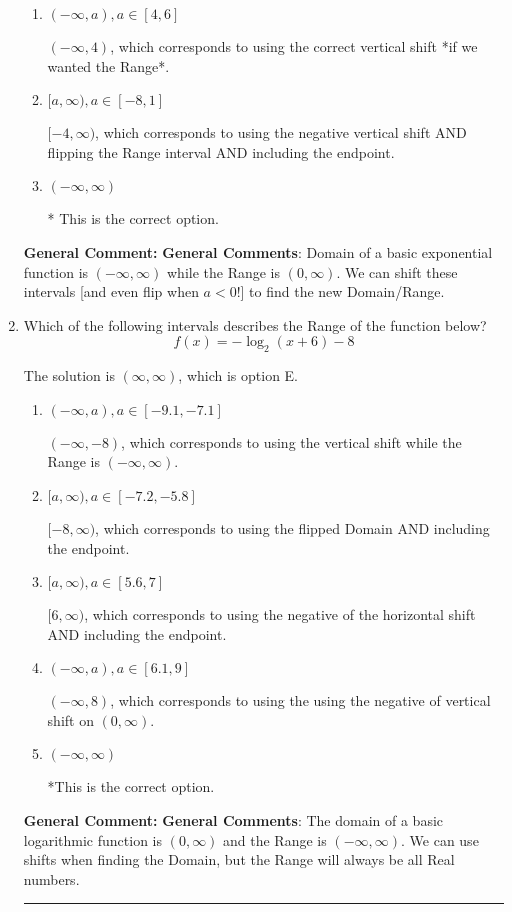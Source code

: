 \documentclass{extbook}[14pt]
\newcommand{\litem}[1]{\item #1

\rule{\textwidth}{0.4pt}}
\begin{document}
\begin{enumerate}
{\begin{enumerate}[label=\Alph*.]
$(-4, \infty)$, which corresponds to using the negative vertical shift AND flipping the Range interval.
\item \( (-\infty, a), a \in [4, 6] \)

$(-\infty, 4)$, which corresponds to using the correct vertical shift *if we wanted the Range*.
\item \( [a, \infty), a \in [-8, 1] \)

$[-4, \infty)$, which corresponds to using the negative vertical shift AND flipping the Range interval AND including the endpoint.
\item \( (-\infty, \infty) \)

* This is the correct option.
\end{enumerate}

\textbf{General Comment:} \textbf{General Comments}: Domain of a basic exponential function is $(-\infty, \infty)$ while the Range is $(0, \infty)$. We can shift these intervals [and even flip when $a<0$!] to find the new Domain/Range.
}
\litem{
Which of the following intervals describes the Range of the function below?
\[ f(x) = -\log_2{(x+6)}-8 \]

The solution is \( (\infty, \infty) \), which is option E.\begin{enumerate}[label=\Alph*.]
\item \( (-\infty, a), a \in [-9.1, -7.1] \)

$(-\infty, -8)$, which corresponds to using the vertical shift while the Range is $(-\infty, \infty)$.
\item \( [a, \infty), a \in [-7.2, -5.8] \)

$[-8, \infty)$, which corresponds to using the flipped Domain AND including the endpoint.
\item \( [a, \infty), a \in [5.6, 7] \)

$[6, \infty)$, which corresponds to using the negative of the horizontal shift AND including the endpoint.
\item \( (-\infty, a), a \in [6.1, 9] \)

$(-\infty, 8)$, which corresponds to using the using the negative of vertical shift on $(0, \infty)$.
\item \( (-\infty, \infty) \)

*This is the correct option.
\end{enumerate}

\textbf{General Comment:} \textbf{General Comments}: The domain of a basic logarithmic function is $(0, \infty)$ and the Range is $(-\infty, \infty)$. We can use shifts when finding the Domain, but the Range will always be all Real numbers.
}
\end{enumerate}
\end{document}
